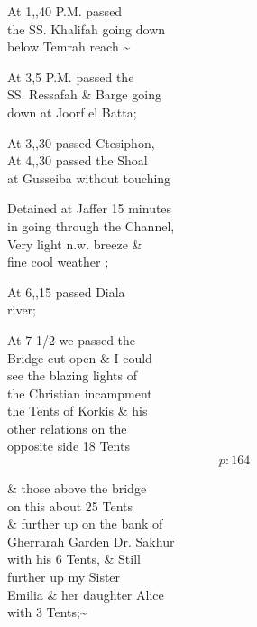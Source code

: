 \documentclass{report}
\begin{document}
	\par{
 	At 1,,40 P.M. passed\ \\the SS. Khalifah going down\ \\below Temrah reach \~{}\ \\
	}

	\par{
 	At 3,5 P.M. passed the\ \\SS. Ressafah \& Barge going\ \\down at Joorf el Batta;\ \\
	}

	\par{
 	At 3,,30 passed Ctesiphon,\ \\At 4,,30 passed the Shoal\ \\at Gusseiba without touching\ \\
	}

	\par{
 	Detained at Jaffer 15 minutes\ \\in going through the Channel,\ \\Very light n.w. breeze \&\ \\fine cool weather ;\ \\
	}

	\par{
 	At 6,,15 passed Diala\ \\river;\ \\
	}

	\par{
 	At 7 1/2 we passed the\ \\Bridge cut open \& I could\ \\see the blazing lights of\ \\the Christian incampment\ \\the Tents of Korkis \& his\ \\other relations on the\ \\opposite side 18 Tents\ \\
  \[p: 164 \]

	}



	\par{
 	\& those above the bridge\ \\on this about 25 Tents\ \\\& further up on the bank of\ \\Gherrarah Garden Dr. Sakhur\ \\with his 6 Tents, \& Still\ \\further up my Sister\ \\Emilia \& her daughter Alice\ \\with 3 Tents;\~{}\ \\
	}
\end{document}

